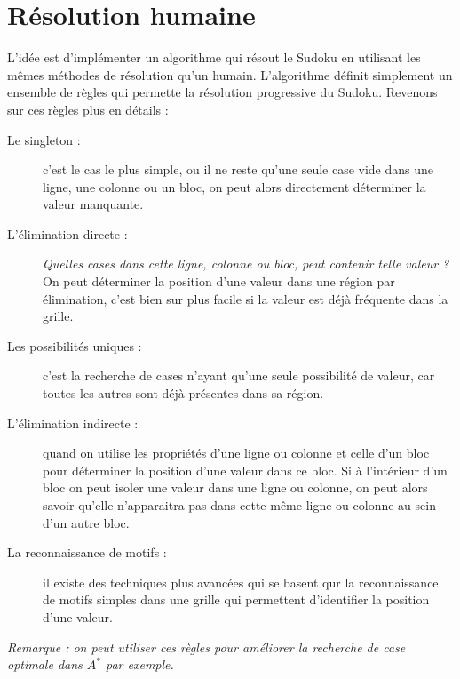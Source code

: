    \section{Résolution humaine}



        L'idée est d'implémenter un algorithme qui résout le Sudoku en utilisant les mêmes méthodes de résolution qu'un humain. L'algorithme définit simplement un ensemble de règles qui permette la résolution progressive du Sudoku. Revenons sur ces règles plus en détails :

        \begin{description}
       \item[Le singleton :] c'est le cas le plus simple, ou il ne reste qu'une seule case vide dans une ligne, une colonne ou un bloc, on peut alors directement déterminer la valeur manquante.

        \item[L'élimination directe :] \textit{Quelles cases dans cette ligne, colonne ou bloc, peut contenir telle valeur ?} On peut déterminer la position d'une valeur dans une région par élimination, c'est bien sur plus facile si la valeur est déjà fréquente dans la grille.

        \item[Les possibilités uniques :] c'est la recherche de cases n'ayant qu'une seule possibilité de valeur, car toutes les autres sont déjà présentes dans sa région.

        \item[L'élimination indirecte :] quand on utilise les propriétés d'une ligne ou colonne et celle d'un bloc pour déterminer la position d'une valeur dans ce bloc. Si à l'intérieur d'un bloc on peut isoler une valeur dans une ligne ou colonne, on peut alors savoir qu'elle n'apparaitra pas dans cette même ligne ou colonne au sein d'un autre bloc.

       \item[La reconnaissance de motifs :] il existe des techniques plus avancées qui se basent qur la reconnaissance de motifs simples dans une grille qui permettent d'identifier la position d'une valeur.


        \end{description}

\textit{Remarque : on peut utiliser ces règles pour améliorer la recherche de case optimale dans $A^*$ par exemple.}






